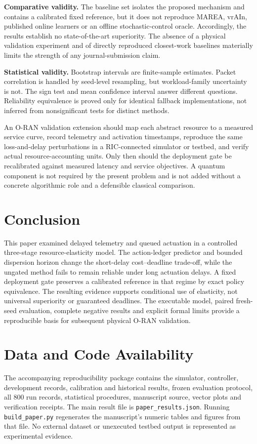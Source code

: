 \documentclass[10pt,a4paper]{article}
\begin{document}
\textbf{Comparative validity.} The baseline set isolates the proposed mechanism
and contains a calibrated fixed reference, but it does not reproduce MAREA,
vrAIn, published online learners or an offline stochastic-control oracle.
Accordingly, the results establish no state-of-the-art superiority. The absence
of a physical validation experiment and of directly reproduced closest-work
baselines materially limits the strength of any journal-submission claim.

\textbf{Statistical validity.} Bootstrap intervals are finite-sample estimates.
Packet correlation is handled by seed-level resampling, but workload-family
uncertainty is not. The sign test and mean confidence interval answer different
questions. Reliability equivalence is proved only for identical fallback
implementations, not inferred from nonsignificant tests for distinct methods.

An O-RAN validation extension should map each abstract resource to a measured
service curve, record telemetry and activation timestamps, reproduce the same
loss-and-delay perturbations in a RIC-connected simulator or testbed, and verify
actual resource-accounting units. Only then should the deployment gate be
recalibrated against measured latency and service objectives. A quantum component
is not required by the present problem and is not added without a concrete
algorithmic role and a defensible classical comparison.

\section{Conclusion}
This paper examined delayed telemetry and queued actuation in a controlled
three-stage resource-elasticity model. The action-ledger predictor and bounded
dispersion horizon change the short-delay cost--deadline trade-off, while the
ungated method fails to remain reliable under long actuation delays. A fixed
deployment gate preserves a calibrated reference in that regime by exact
policy equivalence. The resulting evidence supports conditional use of
elasticity, not universal superiority or guaranteed deadlines. The executable
model, paired fresh-seed evaluation, complete negative results and explicit
formal limits provide a reproducible basis for subsequent physical O-RAN
validation.

\section*{Data and Code Availability}
The accompanying reproducibility package contains the simulator, controller,
development records, calibration and historical results, frozen evaluation
protocol, all 800 run records, statistical procedures, manuscript source,
vector plots and verification receipts. The main result file is
\texttt{paper\_results.json}. Running \texttt{build\_paper.py} regenerates the
manuscript's numeric tables and figures from that file. No external dataset or
unexecuted testbed output is represented as experimental evidence.
\end{document}
